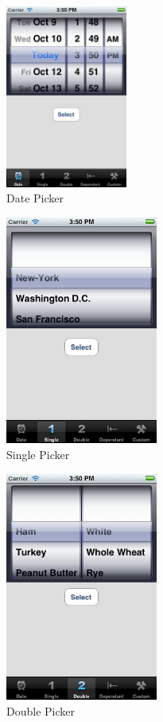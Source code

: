 \documentclass[a4paper, 12pt, final]{article}
\begin{document}
\begin{figure}[!h] %
\centering
\includegraphics[width=4cm]{1.jpg} %
\caption{Date Picker} %
\label{api} %
\end{figure} %
 
\begin{figure}[!h] %
\centering
\includegraphics[width=5cm]{2.jpg} %
\caption{Single Picker} %
\label{api} %
\end{figure} %

 
\begin{figure}[!h] %
\centering
\includegraphics[width=5cm]{3.jpg} %
\caption{Double Picker} %
\label{api} %
\end{figure} %
 
\end{document}

